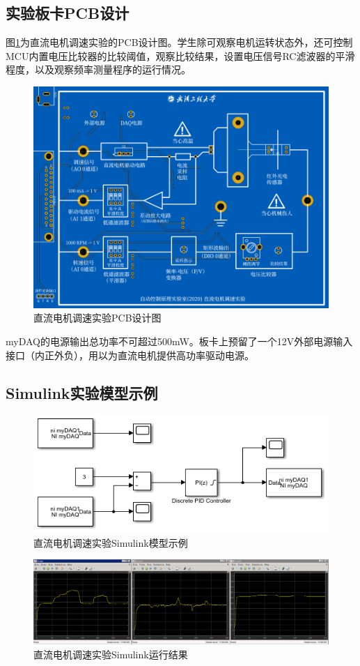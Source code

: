 \documentclass[11pt,a4paper]{article}
\begin{document}
\subsection{实验板卡PCB设计}
图\ref{motor_board}为直流电机调速实验的PCB设计图。学生除可观察电机运转状态外，还可控制MCU内置电压比较器的比较阈值，观察比较结果，设置电压信号RC滤波器的平滑程度，以及观察频率测量程序的运行情况。
\begin{figure}[h!]\centering
  \includegraphics[width=14cm]{./figs/motor_board.png}
  \caption{直流电机调速实验PCB设计图}\label{motor_board}
\end{figure}

myDAQ的电源输出总功率不可超过500mW。板卡上预留了一个12V外部电源输入接口（内正外负），用以为直流电机提供高功率驱动电源。

\subsection{Simulink实验模型示例}
\begin{figure}[h!]\centering
  \includegraphics[width=12cm]{./figs/motor_pi.png}
  \caption{直流电机调速实验Simulink模型示例}\label{motor_pi}
\end{figure}
\begin{figure}[h!]\centering
  \includegraphics[width=16cm]{./figs/motor_result.png}
  \caption{直流电机调速实验Simulink运行结果}\label{motor_result}
\end{figure}
\end{document}
